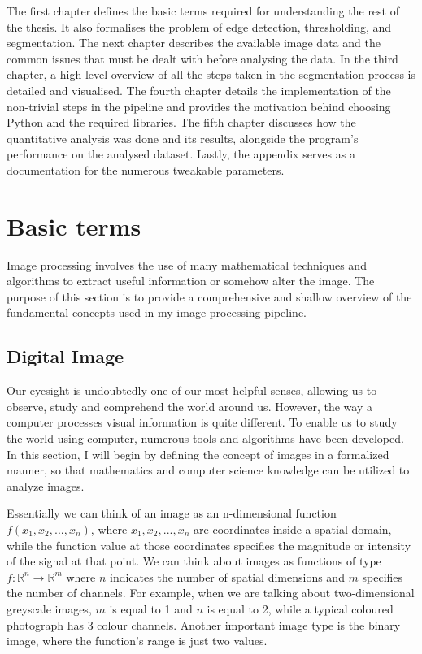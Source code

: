 \documentclass[
  digital,     %
  oneside,     %
  nosansbold,  %
  nocolorbold, %
  lof,         %
  lot,         %
]{fithesis4}
\newcommand*{\R}{\ensuremath{\mathbb{R}}}
\begin{document}
The first chapter defines the basic terms required for understanding the rest of the thesis. It also formalises the problem of edge detection, thresholding, and segmentation. The next chapter describes the available image data and the common issues that must be dealt with before analysing the data. In the third chapter, a high-level overview of all the steps taken in the segmentation process is detailed and visualised. The fourth chapter details the implementation of the non-trivial steps in the pipeline and provides the motivation behind choosing Python and the required libraries. The fifth chapter discusses how the quantitative analysis was done and its results, alongside the program's performance on the analysed dataset. Lastly, the appendix serves as a documentation for the numerous tweakable parameters.

\chapter{Basic terms}

Image processing involves the use of many mathematical techniques and algorithms
to extract useful information or somehow alter the image. The purpose of this
section is to provide a comprehensive and shallow overview of the fundamental
concepts used in my image processing pipeline.

\section{Digital Image}
Our eyesight is undoubtedly one of our most helpful senses, allowing us to
observe, study and comprehend the world around us. However, the way a computer
processes visual information is quite different. To enable us to study the world
using computer, numerous tools and algorithms have been developed. In this
section, I will begin by defining the concept of images in a formalized manner,
so that mathematics and computer science knowledge can be utilized to analyze
images.

Essentially we can think of an image as an n-dimensional function $f(x_1, x_2,
..., x_n)$, where $x_1, x_2, ..., x_n$ are coordinates inside a spatial domain,
while the function value at those coordinates specifies the magnitude or
intensity of the signal at that point. We can think about images as functions of
type $f:\R^n \rightarrow \R^m$ where $n$ indicates the number of spatial
dimensions and $m$ specifies the number of channels. For example, when we are
talking about two-dimensional greyscale images, $m$ is equal to 1 and $n$ is
equal to 2, while a typical coloured photograph has 3 colour channels. Another
important image type is the binary image, where the function's range is just two
values.
\end{document}
